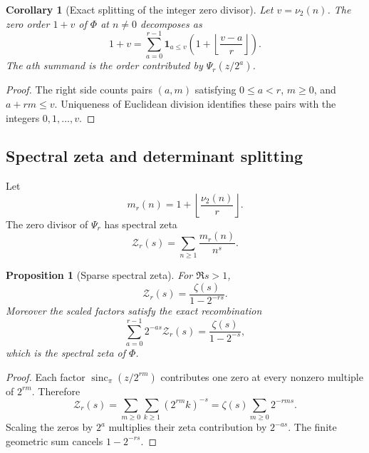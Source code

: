 \documentclass[11pt,oneside]{article}
\numberwithin{equation}{section}
\newtheorem{proposition}[theorem]{Proposition}
\newtheorem{corollary}[theorem]{Corollary}
\theoremstyle{definition}
\theoremstyle{remark}
\newcommand{\sincpi}{\operatorname{sinc}_{\pi}}
\newcommand{\vtwo}{\nu_2}
\begin{document}
\begin{corollary}[Exact splitting of the integer zero divisor]
\label{cor:zero-divisor-split}
Let $v=\vtwo(n)$.  The zero order $1+v$ of $\Phi$ at $n\ne0$ decomposes as
\begin{equation}
 1+v=\sum_{a=0}^{r-1}
 \mathbf1_{a\le v}\left(1+\left\lfloor\frac{v-a}{r}\right\rfloor\right). \label{eq:valuation-split}
\end{equation}
The $a$th summand is the order contributed by $\Psi_r(z/2^a)$.
\end{corollary}

\begin{proof}
The right side counts pairs $(a,m)$ satisfying
$0\le a<r$, $m\ge0$, and $a+rm\le v$.  Uniqueness of Euclidean division
identifies these pairs with the integers $0,1,\ldots,v$.
\end{proof}

\subsection{Spectral zeta and determinant splitting}

Let
\begin{equation}
 m_r(n)=1+\left\lfloor\frac{\vtwo(n)}r\right\rfloor.        \label{eq:mr-def}
\end{equation}
The zero divisor of $\Psi_r$ has spectral zeta
\begin{equation}
 \mathcal Z_r(s)=\sum_{n\ge1}\frac{m_r(n)}{n^s}.            \label{eq:Zr-def}
\end{equation}

\begin{proposition}[Sparse spectral zeta]
\label{prop:sparse-spectral-zeta}
For $\Re s>1$,
\begin{equation}
 \boxed{\displaystyle
 \mathcal Z_r(s)=\frac{\zeta(s)}{1-2^{-rs}}.}               \label{eq:sparse-spectral-zeta}
\end{equation}
Moreover the scaled factors satisfy the exact recombination
\begin{equation}
 \sum_{a=0}^{r-1}2^{-as}\mathcal Z_r(s)
 =\frac{\zeta(s)}{1-2^{-s}},                               \label{eq:spectral-zeta-recombine}
\end{equation}
which is the spectral zeta of $\Phi$.
\end{proposition}

\begin{proof}
Each factor $\sincpi(z/2^{rm})$ contributes one zero at every nonzero multiple
of $2^{rm}$.  Therefore
\[
 \mathcal Z_r(s)
 =\sum_{m\ge0}\sum_{k\ge1}(2^{rm}k)^{-s}
 =\zeta(s)\sum_{m\ge0}2^{-rms}.
\]
Scaling the zeros by $2^a$ multiplies their zeta contribution by $2^{-as}$.
The finite geometric sum cancels $1-2^{-rs}$.
\end{proof}
\end{document}
